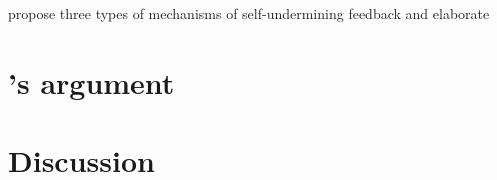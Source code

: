 \documentclass[11pt]{article}
\begin{document}
\textcite[][]{Jacobs2014} propose three types of mechanisms of self-undermining feedback and elaborate 


\section*{\citeauthor[][]{Jacobs2014}'s \citeyear{Jacobs2014} argument}


\section*{Discussion}


\newpage
\newpage
\thispagestyle{empty}
\begingroup
{}
\printbibliography
\endgroup
\end{document}
